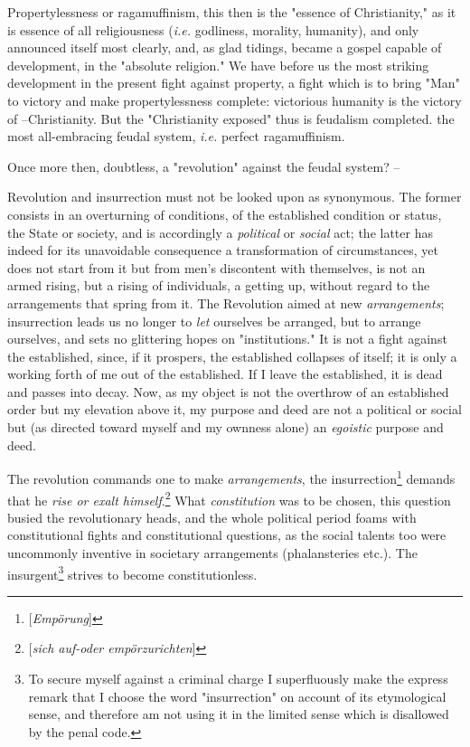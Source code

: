 \documentclass[a4paper]{book}
\begin{document}
Propertylessness or ragamuffinism, this then is the "{}essence of 
Christianity,"{} as it is essence of all religiousness (\textit{i.e.} 
godliness, morality, humanity), and only announced itself most clearly, and, 
as glad tidings, became a gospel capable of development, in the "{}absolute 
religion."{} We have before us the most striking development in the present 
fight against property, a fight which is to bring "{}Man"{} to victory and 
make propertylessness complete: victorious humanity is the victory of 
--Christianity. But the "{}Christianity exposed"{} thus is feudalism 
completed. the most all-embracing feudal system, \textit{i.e.} perfect 
ragamuffinism.

Once more then, doubtless, a "{}revolution"{} against the feudal system? --

Revolution and insurrection must not be looked upon as synonymous. The former 
consists in an overturning of conditions, of the established condition or 
status, the State or society, and is accordingly a \textit{political} or 
\textit{social} act; the latter has indeed for its unavoidable consequence a 
transformation of circumstances, yet does not start from it but from men's 
discontent with themselves, is not an armed rising, but a rising of 
individuals, a getting up, without regard to the arrangements that spring from 
it. The Revolution aimed at new \textit{arrangements}; insurrection leads us 
no longer to \textit{let} ourselves be arranged, but to arrange ourselves, and 
sets no glittering hopes on "{}institutions."{} It is not a fight against the 
established, since, if it prospers, the established collapses of itself; it is 
only a working forth of me out of the established. If I leave the established, 
it is dead and passes into decay. Now, as my object is not the overthrow of an 
established order but my elevation above it, my purpose and deed are not a 
political or social but (as directed toward myself and my ownness alone) an 
\textit{egoistic} purpose and deed.

The revolution commands one to make \textit{arrangements}, the 
insurrection\footnote{[\textit{Emp\"orung}]} demands that he \textit{rise or 
exalt himself}.\footnote{[\textit{sich auf-oder emp\"orzurichten}]} What 
\textit{constitution} was to be chosen, this question busied the revolutionary 
heads, and the whole political period foams with constitutional fights and 
constitutional questions, as the social talents too were uncommonly inventive 
in societary arrangements (phalansteries etc.). The insurgent\footnote{To 
secure myself against a criminal charge I superfluously make the express 
remark that I choose the word "{}insurrection"{} on account of its 
etymological sense, and therefore am not using it in the limited sense which 
is disallowed by the penal code.} strives to become constitutionless.
\end{document}
